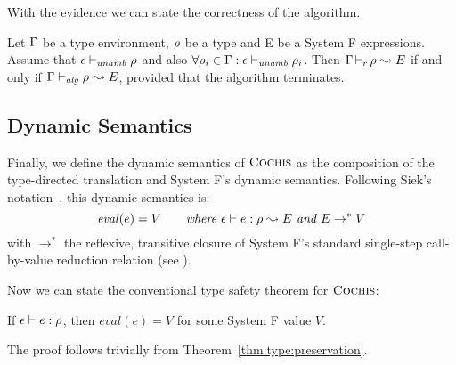 With the evidence we can state the correctness of the algorithm.
\begin{theorem}
Let $\Gamma$ be a type environment, $\rho$ be a type and E be a System F expressions.
Assume that $\epsilon \vdash_{\mathit{unamb}} \rho$ and also $\forall \rho_i \in \Gamma: \epsilon \vdash_{\mathit{unamb}} \rho_i$.
Then $\Gamma \mathop{\vdash_{r}} \rho \leadsto E$ if and only if $\Gamma \vdash_{\mathit{alg}} \rho \leadsto E$,
provided that the algorithm terminates.
\end{theorem}

\subsection{Dynamic Semantics}
Finally, we define the dynamic semantics of $\textsc{Cochis}$ as the composition of
the type-directed translation and System F's dynamic semantics.  Following
Siek's notation~\cite{systemfg}, this dynamic semantics is:
\[ \mathit{eval}(e) = V \quad\quad \textit{where } \epsilon \vdash e:\rho \leadsto E \textit{ and } E \rightarrow^* V  \]
with $\rightarrow^*$ the reflexive, transitive closure of System F's standard single-step call-by-value reduction relation (see \cite[Chapter 23]{tapl}).

Now we can state the conventional type safety theorem for $\textsc{Cochis}$:
\begin{theorem}
If $\epsilon \vdash e:\rho$, then $\mathit{eval}(e) = V$ for
some System F value $V$.
\end{theorem}
The proof follows trivially from Theorem~\ref{thm:type:preservation}.


